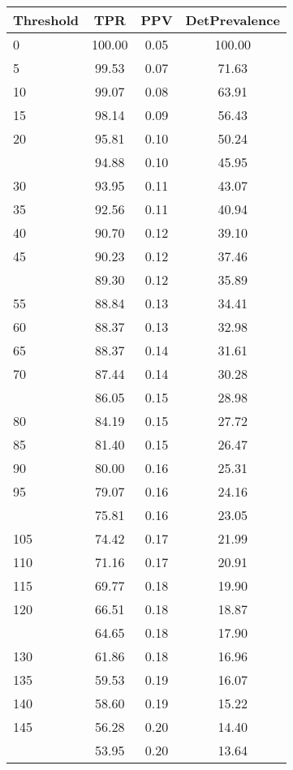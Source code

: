 \begin{table}[ht]
\centering
\begin{tabular}{lccc}
  \toprule
Threshold & TPR & PPV & DetPrevalence \\ 
  \midrule
0 & 100.00 & 0.05 & 100.00 \\ 
  5 & 99.53 & 0.07 & 71.63 \\ 
  10 & 99.07 & 0.08 & 63.91 \\ 
  15 & 98.14 & 0.09 & 56.43 \\ 
  20 & 95.81 & 0.10 & 50.24 \\ 
   \addlinespace
25 & 94.88 & 0.10 & 45.95 \\ 
  30 & 93.95 & 0.11 & 43.07 \\ 
  35 & 92.56 & 0.11 & 40.94 \\ 
  40 & 90.70 & 0.12 & 39.10 \\ 
  45 & 90.23 & 0.12 & 37.46 \\ 
   \addlinespace
50 & 89.30 & 0.12 & 35.89 \\ 
  55 & 88.84 & 0.13 & 34.41 \\ 
  60 & 88.37 & 0.13 & 32.98 \\ 
  65 & 88.37 & 0.14 & 31.61 \\ 
  70 & 87.44 & 0.14 & 30.28 \\ 
   \addlinespace
75 & 86.05 & 0.15 & 28.98 \\ 
  80 & 84.19 & 0.15 & 27.72 \\ 
  85 & 81.40 & 0.15 & 26.47 \\ 
  90 & 80.00 & 0.16 & 25.31 \\ 
  95 & 79.07 & 0.16 & 24.16 \\ 
   \addlinespace
100 & 75.81 & 0.16 & 23.05 \\ 
  105 & 74.42 & 0.17 & 21.99 \\ 
  110 & 71.16 & 0.17 & 20.91 \\ 
  115 & 69.77 & 0.18 & 19.90 \\ 
  120 & 66.51 & 0.18 & 18.87 \\ 
   \addlinespace
125 & 64.65 & 0.18 & 17.90 \\ 
  130 & 61.86 & 0.18 & 16.96 \\ 
  135 & 59.53 & 0.19 & 16.07 \\ 
  140 & 58.60 & 0.19 & 15.22 \\ 
  145 & 56.28 & 0.20 & 14.40 \\ 
   \addlinespace
150 & 53.95 & 0.20 & 13.64 \\ 

\end{tabular}
\end{table}
